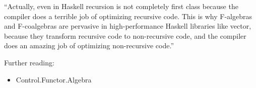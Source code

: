 \documentclass{beamer}
\begin{document}
\begin{frame}
``Actually, even in Haskell recursion is not completely first class because the compiler does a terrible job of optimizing recursive code. This is why F-algebras and F-coalgebras are pervasive in high-performance Haskell libraries like vector, because they transform recursive code to non-recursive code, and the compiler does an amazing job of optimizing non-recursive code.''

\end{frame}
\begin{frame}
Further reading:
\begin{itemize}
\item Control.Functor.Algebra
\end{itemize}
\end{frame}
\end{document}
